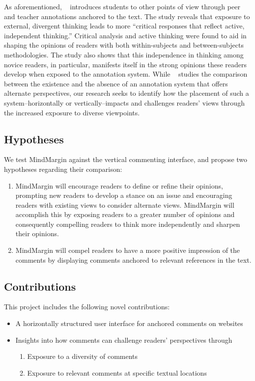 As aforementioned, ~\cite{AnnotationsStudents} introduces students to other points of view through peer and teacher annotations anchored to the text. The study reveals that exposure to external, divergent thinking leads to more “critical responses that reflect active, independent thinking.” Critical analysis and active thinking were found to aid in shaping the opinions of readers with both within-subjects and between-subjects methodologies. The study also shows that this independence in thinking among novice readers, in particular, manifests itself in the strong opinions these readers develop when exposed to the annotation system. While ~\cite{AnnotationsStudents} studies the comparison between the existence and the absence of an annotation system that offers alternate perspectives, our research seeks to identify how the placement of such a system--horizontally or vertically--impacts and challenges readers’ views through the increased exposure to diverse viewpoints.

\subsection{Hypotheses}
We test MindMargin against the vertical commenting interface, and propose two hypotheses regarding their comparison:
\begin{enumerate}
\item MindMargin will encourage readers to define or refine their opinions, prompting new readers to develop a stance on an issue and encouraging readers with existing views to consider alternate views. MindMargin will accomplish this by exposing readers to a greater number of opinions and consequently compelling readers to think more independently and sharpen their opinions. 
\item MindMargin will compel readers to have a more positive impression of the comments by displaying comments anchored to relevant references in the text.
\end{enumerate}

\subsection{Contributions}
This project includes the following novel contributions:
\begin{itemize}
\item A horizontally structured user interface for anchored comments on websites
\item Insights into how comments can challenge readers’ perspectives through
\begin{enumerate}
\item Exposure to a diversity of comments
\item Exposure to relevant comments at specific textual locations
\end{enumerate}
\end{itemize}

